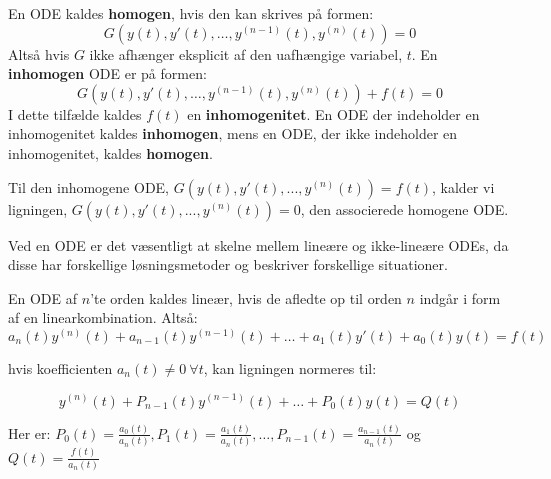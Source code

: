 \begin{definition}[Homogenitet]
En ODE kaldes \textbf{homogen}, hvis den kan skrives på formen: 
$$G(y(t),y'(t), \hdots, y^{(n-1)}(t),y^{(n)}(t))=0$$ 
Altså hvis $G$ ikke afhænger eksplicit af den uafhængige variabel, $t$. En \textbf{inhomogen} ODE er på formen: 
$$G(y(t),y'(t),\hdots, y^{(n-1)}(t),y^{(n)}(t))+f(t)=0$$
I dette tilfælde kaldes $f(t)$ en \textbf{inhomogenitet}. En ODE der indeholder en inhomogenitet kaldes \textbf{inhomogen}, mens en ODE, der ikke indeholder en inhomogenitet, kaldes \textbf{homogen}.
\end{definition}
Til den inhomogene ODE, $G(y(t),y'(t),...,y^{(n)}(t))=f(t)$, kalder vi ligningen, $G(y(t),y'(t),...,y^{(n)}(t))=0$, den associerede homogene ODE. 

Ved en ODE er det væsentligt at skelne mellem lineære og ikke-lineære ODEs, da disse har forskellige løsningsmetoder og beskriver forskellige situationer.

\begin{definition}\label{OLDE}En ODE af $n$'te orden kaldes lineær, hvis de afledte op til orden $n$ indgår i form af en linearkombination. Altså: \\ 
$$a_{n}(t)y^{(n)}(t)  + a_{n-1}(t)y^{(n-1)}(t)+ \hdots + a_{1}(t)y'(t) + a_{0}(t)y(t) = f(t)$$

hvis koefficienten $a_n(t)\neq 0 \ \forall t$, kan ligningen normeres til:

$$y^{(n)}(t)+P_{n-1}(t)y^{(n-1)}(t)+\hdots +P_0(t)y(t)=Q(t)$$ 

Her er: $P_0(t)=\frac{a_0(t)}{a_n(t)} , P_1(t)=\frac{a_1(t)}{a_n(t)}, \hdots, P_{n-1}(t)=\frac{a_{n-1}(t)}{a_n(t)}$ og $Q(t)=\frac{f(t)}{a_n(t)}$
\end{definition}


